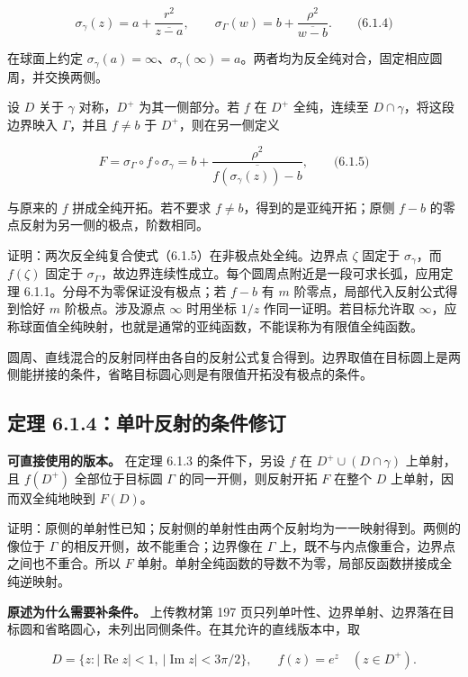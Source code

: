 \documentclass[11pt,a4paper]{article}
\begin{document}
\[
\sigma_\gamma(z)=a+\frac{r^2}{\overline{z-a}},\qquad
\sigma_\Gamma(w)=b+\frac{\rho^2}{\overline{w-b}}.
\qquad\text{(6.1.4)}
\]

在球面上约定
\(\sigma_\gamma(a)=\infty\)、\(\sigma_\gamma(\infty)=a\)。两者均为反全纯对合，固定相应圆周，并交换两侧。

设 \(D\) 关于 \(\gamma\) 对称，\(D^+\) 为其一侧部分。若 \(f\) 在 \(D^+\)
全纯，连续至 \(D\cap\gamma\)，将这段边界映入 \(\Gamma\)，并且 \(f\ne b\)
于 \(D^+\)，则在另一侧定义

\[
F=\sigma_\Gamma\circ f\circ\sigma_\gamma
=b+\frac{\rho^2}{\overline{f(\sigma_\gamma(z))-b}},
\qquad\text{(6.1.5)}
\]

与原来的 \(f\) 拼成全纯开拓。若不要求 \(f\ne b\)，得到的是亚纯开拓；原侧
\(f-b\) 的零点反射为另一侧的极点，阶数相同。

证明：两次反全纯复合使式（6.1.5）在非极点处全纯。边界点 \(\zeta\) 固定于
\(\sigma_\gamma\)，而 \(f(\zeta)\) 固定于
\(\sigma_\Gamma\)，故边界连续性成立。每个圆周点附近是一段可求长弧，应用定理
6.1.1。分母不为零保证没有极点；若 \(f-b\) 有 \(m\)
阶零点，局部代入反射公式得到恰好 \(m\) 阶极点。涉及源点 \(\infty\)
时用坐标 \(1/z\) 作同一证明。若目标允许取
\(\infty\)，应称球面值全纯映射，也就是通常的亚纯函数，不能误称为有限值全纯函数。

圆周、直线混合的反射同样由各自的反射公式复合得到。边界取值在目标圆上是两侧能拼接的条件，省略目标圆心则是有限值开拓没有极点的条件。

\subsection{定理 6.1.4：单叶反射的条件修订}\label{ch06-s1-heading-4}

\textbf{可直接使用的版本。} 在定理 6.1.3 的条件下，另设 \(f\) 在
\(D^+\cup(D\cap\gamma)\) 上单射，且 \(f(D^+)\) 全部位于目标圆 \(\Gamma\)
的同一开侧，则反射开拓 \(F\) 在整个 \(D\) 上单射，因而双全纯地映到
\(F(D)\)。

证明：原侧的单射性已知；反射侧的单射性由两个反射均为一一映射得到。两侧的像位于
\(\Gamma\) 的相反开侧，故不能重合；边界像在 \(\Gamma\)
上，既不与内点像重合，边界点之间也不重合。所以 \(F\)
单射。单射全纯函数的导数不为零，局部反函数拼接成全纯逆映射。

\textbf{原述为什么需要补条件。} 上传教材第 197
页只列单叶性、边界单射、边界落在目标圆和省略圆心，未列出同侧条件。在其允许的直线版本中，取

\[
D=\{z:|\operatorname{Re}z|<1,\ |\operatorname{Im}z|<3\pi/2\},
\qquad f(z)=e^z\quad(z\in D^+).
\]
\end{document}
